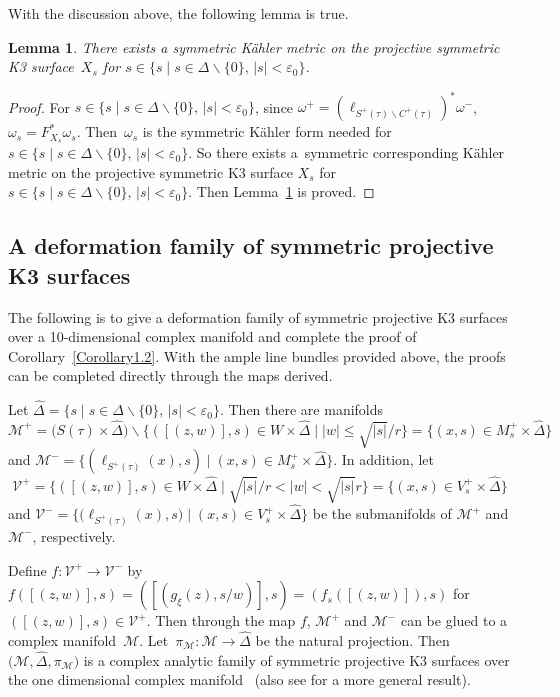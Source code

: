 \documentclass[pdftex]{sigma}
\numberwithin{equation}{section}
\newtheorem{Lemma}[Theorem]{Lemma}
\begin{document}
With the discussion above, the following lemma is true.

\begin{Lemma} \label{Lemma4.2}
There exists a symmetric K\"ahler metric on the projective symmetric K3 surface~$X_s$ for $s \in \{ s\mid s \in \Delta \backslash \{ 0 \},\, |s|<\varepsilon_0 \}$.
\end{Lemma}

\begin{proof}
For $s \in \{ s\mid s \in \Delta \backslash \{ 0 \},\, |s|<\varepsilon_0 \}$, since $\omega^+=(\ell_{S^+(\tau)\backslash C^+(\tau)})^*\omega^-$, $\omega_s=F^*_{X_s}\omega_s$. Then~$\omega_s$ is the symmetric K\"ahler form needed for $s \in \{ s\mid s \in \Delta \backslash \{ 0 \},\, |s|<\varepsilon_0 \}$. So there exists a~symmetric corresponding K\"ahler metric on the projective symmetric K3 surface $X_s$ for $s \in \{ s\mid s \in \Delta \backslash \{ 0 \},\, |s|<\varepsilon_0 \}$. Then Lemma~\ref{Lemma4.2} is proved.
\end{proof}

\subsection{A deformation family of symmetric projective K3 surfaces}

The following is to give a deformation family of symmetric projective K3 surfaces over a 10-dimensional complex manifold and complete the proof of Corollary~\ref{Corollary1.2}. With the ample line bundles provided above, the proofs can be completed directly through the maps derived.

Let $\hat{\Delta}=\{ s\mid s \in \Delta \backslash \{ 0 \},\, |s|<\varepsilon_0 \}$. Then there are manifolds
\[\mathcal{M}^+=\bigl(S(\tau)\times \hat{\Delta}\bigr)\backslash \bigl\{ ([(z,w)],s)\in W \times \hat{\Delta} \mid |w|\leq \sqrt{|s|}/r \bigr\}=\bigl\{ (x,s) \in M^+_s \times \hat{\Delta}\bigr\}\]
and
$\mathcal{M}^-=\bigl\{(\ell_{S^+(\tau)}(x),s) \mid (x,s) \in M^+_s \times \hat{\Delta}\bigr\}$.
In addition, let
\[\mathcal{V}^+=\bigl\{ ([(z,w)],s)\in W \times \hat{\Delta} \mid \sqrt{|s|}/r <|w| <\sqrt{|s|} r\bigr\}=\bigl\{ (x,s) \in V^+_s \times \hat{\Delta}\bigr\}\]
and
$\mathcal{V}^-=\bigl\{ \bigl(\ell_{S^+(\tau)}(x),s\bigr) \mid (x,s) \in V^+_s \times \hat{\Delta}\bigr\}$
be the submanifolds of $\mathcal{M}^+$ and $\mathcal{M}^-$, respectively.

Define $f\colon\mathcal{V}^+ \rightarrow \mathcal{V}^-$ by
$f([(z,w)],s)=([(g_\xi(z),s/w)],s)=(f_s([(z,w)]),s)$
for $([(z,w)],s)\allowbreak\in \mathcal{V}^+$. Then through the map $f$, $\mathcal{M}^+$ and $\mathcal{M}^-$ can be glued to a complex manifold~$\mathcal{M}$. Let~${\pi_{\mathcal{M}}\colon\mathcal{M} \rightarrow \hat{\Delta}}$ be the natural projection. Then $\bigl(\mathcal{M}, \hat{\Delta}, \pi_{\mathcal{M}}\bigr)$ is a complex analytic family of symmetric projective K3 surfaces over the one dimensional complex manifold~\smash{$\hat{\Delta}$} (also see \cite{Takayuki-Takato2} for a more general result).
\end{document}
